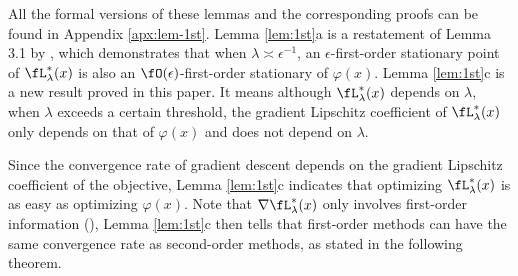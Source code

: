 \documentclass{article}
\begin{document}
All the formal versions of these lemmas and the corresponding proofs can be found in Appendix \ref{apx:lem-1st}.
Lemma \ref{lem:1st}a is a restatement of Lemma 3.1 by \citet{kwon2023fully}, which demonstrates that when $\lambda \asymp \epsilon^{-1}$, an $\epsilon$-first-order stationary point of $\fL_{\lambda}^*(x)$ is also an $\fO(\epsilon)$-first-order stationary of $\varphi(x)$.
Lemma \ref{lem:1st}c is a new result proved in this paper. It means although $\fL_{\lambda}^*(x)$ depends on $\lambda$, when $\lambda$ exceeds a certain threshold, the gradient Lipschitz coefficient of $\fL_{\lambda}^*(x)$ only depends on that of $\varphi(x)$ and does not depend on $\lambda$.  

Since the convergence rate of gradient descent depends on the gradient Lipschitz coefficient of the objective, Lemma \ref{lem:1st}c indicates that optimizing $\fL_{\lambda}^*(x)$ is as easy as optimizing $\varphi(x)$. 
Note that
$\nabla \fL_{\lambda}^*(x)$ only involves first-order information (), Lemma \ref{lem:1st}c then tells that first-order methods can have the same convergence rate as second-order methods, as stated in the following theorem.



\end{document}
